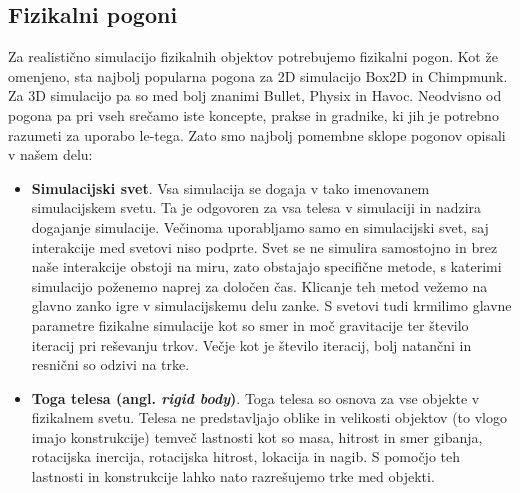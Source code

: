 \documentclass[12pt,a4paper,twoside]{book}
\begin{document}
\subsection{Fizikalni pogoni}
Za realistično simulacijo fizikalnih objektov potrebujemo fizikalni pogon. Kot že omenjeno, sta najbolj popularna pogona za 2D simulacijo Box2D in Chimpmunk. Za 3D simulacijo pa so med bolj znanimi Bullet, Physix in Havoc. Neodvisno od pogona pa pri vseh srečamo iste koncepte, prakse in gradnike, ki jih je potrebno razumeti za uporabo le-tega. Zato smo najbolj pomembne sklope pogonov opisali v našem delu:
\begin{itemize}
	\item \textbf{Simulacijski svet}.  Vsa simulacija se dogaja v tako imenovanem simulacijskem svetu. Ta je odgovoren za vsa telesa v simulaciji in nadzira dogajanje simulacije. Večinoma uporabljamo samo en simulacijski svet, saj interakcije med svetovi niso podprte. Svet se ne simulira samostojno in brez naše interakcije obstoji na miru, zato obstajajo specifične metode, s katerimi simulacijo poženemo naprej za določen čas. Klicanje teh metod vežemo na glavno zanko igre v simulacijskemu delu zanke. S svetovi tudi krmilimo glavne parametre fizikalne simulacije kot so smer in moč gravitacije ter število iteracij pri reševanju trkov. Večje kot je število iteracij, bolj natančni in resnični so odzivi na trke.
	\item \textbf{Toga telesa (angl. \textit{rigid body})}. Toga telesa so osnova za vse objekte v fizikalnem svetu. Telesa ne predstavljajo oblike in velikosti objektov (to vlogo imajo konstrukcije) temveč lastnosti kot so  masa, hitrost  in smer gibanja, rotacijska inercija, rotacijska hitrost, lokacija in nagib. S pomočjo teh lastnosti in konstrukcije lahko nato razrešujemo trke med objekti.
	

\end{itemize}
\end{document}
